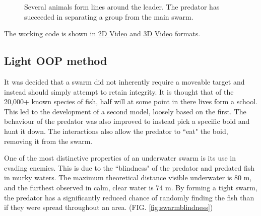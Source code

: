 \documentclass[
reprint,
showpacs,preprintnumbers,
amsmath,amssymb,
prl,
]{revtex4-1}
\begin{document}
\begin{figure}[!htp]

	\caption{
		Several animals form lines around the leader.
		The predator has succeeded in separating a group from the main swarm.
	}

	\label{fig:animallines}
\end{figure}

The working code is shown in \href{https://youtu.be/EyhdRhi5Gnc}{2D Video} and \href{https://youtu.be/KG7qQum6EUc}{3D Video} formats.


\subsection{\label{sec:level2}Light OOP method}

It was decided that a swarm did not inherently require a moveable target and instead should simply attempt to retain integrity.
It is thought that of the 20,000+ known species of fish, half will at some point in there lives form a school.\cite{fishschools}
This led to the development of a second model, loosely based on the first.
The behaviour of the predator was also improved to instead pick a specific boid and hunt it down.
The interactions also allow the predator to ``eat" the boid, removing it from the swarm.

One of the most distinctive properties of an underwater swarm is its use in evading enemies.
This is due to the ``blindness" of the predator and predated fish in murky waters.
The maximum theoretical distance visible underwater is 80 m, and the furthest observed in calm, clear water is 74 m.\cite{underwatervision}
By forming a tight swarm, the predator has a significantly reduced chance of randomly finding the fish than if they were spread throughout an area. (FIG. \ref{fig:swarmblindness})
\end{document}
